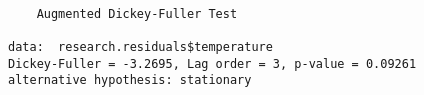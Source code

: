 \begin{verbatim} 

	Augmented Dickey-Fuller Test

data:  research.residuals$temperature
Dickey-Fuller = -3.2695, Lag order = 3, p-value = 0.09261
alternative hypothesis: stationary

\end{verbatim}